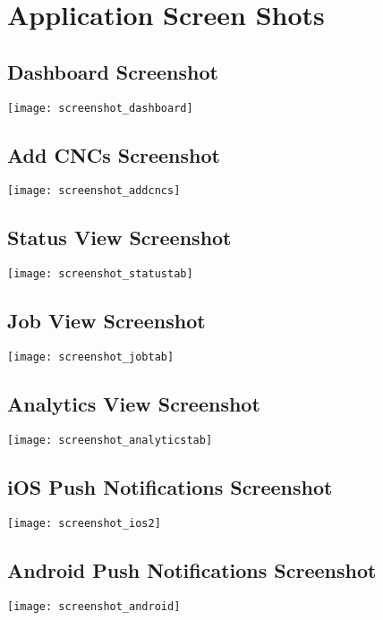 \documentclass[12pt,letterpaper,titlepage]{article}
\begin{document}
\section{Application Screen Shots} \label{app:ScreenShots}

\subsection{Dashboard Screenshot} \label{app:dashboard}
\texttt{[image: screenshot\_dashboard]}
\subsection{Add CNCs Screenshot} \label{app:AddCncs}
\texttt{[image: screenshot\_addcncs]}
\subsection{Status View Screenshot} \label{app:status}
\texttt{[image: screenshot\_statustab]}
\subsection{Job View Screenshot} \label{app:job}
\texttt{[image: screenshot\_jobtab]}
\subsection{Analytics View Screenshot} \label{app:analytics}
\texttt{[image: screenshot\_analyticstab]}
\subsection{iOS Push Notifications Screenshot} \label{app:ios}
\begin{center}
\texttt{[image: screenshot\_ios2]}
\end{center}
\subsection{Android Push Notifications Screenshot} \label{app:android}
\begin{center}
\texttt{[image: screenshot\_android]}
\end{center}
\end{document}
